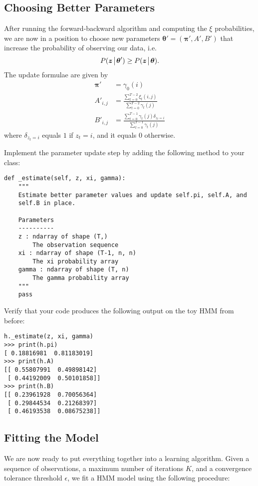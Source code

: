 \subsection*{Choosing Better Parameters}
After running the forward-backward algorithm and computing the $\xi$ probabilities, we are now in a position to choose new parameters $\boldsymbol\theta' = (\boldsymbol\pi', A', B')$
that increase the probability of observing our data, i.e.
\[
P(\boldsymbol z \!\mathrel{\big|}\! \boldsymbol\theta') \geq P(\boldsymbol z \!\mathrel{\big|}\! \boldsymbol\theta).
\]
The update formulae are given by
\begin{align*}
\boldsymbol\pi' &= \gamma_0(i) \\
A'_{i,j} &= \frac{\sum_{t=0}^{T-2}\xi_{t}(i,j)}{\sum_{t=0}^{T-2}\gamma_{t}(j)}\\
B'_{i,j} &= \frac{\sum_{t=0}^{T-1}\gamma_t(j)\delta_{z_t=i}}{\sum_{t=0}^{T-1}\gamma_t(j)}
\end{align*}
where $\delta_{z_t=i}$ equals $1$ if $z_t=i$, and it equals $0$ otherwise.
\begin{problem}
Implement the parameter update step by adding the following method to your class:
\begin{lstlisting}
def _estimate(self, z, xi, gamma):
    """
    Estimate better parameter values and update self.pi, self.A, and 
    self.B in place.

    Parameters
    ----------
    z : ndarray of shape (T,)
        The observation sequence
    xi : ndarray of shape (T-1, n, n)
        The xi probability array
    gamma : ndarray of shape (T, n)
        The gamma probability array
    """
    pass
\end{lstlisting}
Verify that your code produces the following output on the toy HMM from before:
\begin{lstlisting}
h._estimate(z, xi, gamma)
>>> print(h.pi)
[ 0.18816981  0.81183019]
>>> print(h.A)
[[ 0.55807991  0.49898142]
 [ 0.44192009  0.50101858]]
>>> print(h.B)
[[ 0.23961928  0.70056364]
 [ 0.29844534  0.21268397]
 [ 0.46193538  0.08675238]]
\end{lstlisting}
\end{problem}

\subsection*{Fitting the Model}
We are now ready to put everything together into a learning algorithm.
Given a sequence of observations, a maximum number of iterations $K$, and a convergence tolerance threshold $\epsilon$, we fit a HMM model using the following procedure:

